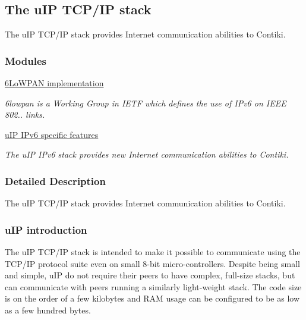 \hypertarget{a00074}{}\subsection{The u\+IP T\+C\+P/\+IP stack}
\label{a00074}


The u\+IP T\+C\+P/\+IP stack provides Internet communication abilities to Contiki.  


\subsubsection*{Modules}
\begin{DoxyCompactItemize}
\item 
\hyperlink{a00070}{6\+Lo\+W\+P\+A\+N implementation}
\begin{DoxyCompactList}\small\item\em 6lowpan is a Working Group in I\+E\+TF which defines the use of I\+Pv6 on I\+E\+EE 802.. links. \end{DoxyCompactList}\item 
\hyperlink{a00075}{u\+I\+P I\+Pv6 specific features}
\begin{DoxyCompactList}\small\item\em The u\+IP I\+Pv6 stack provides new Internet communication abilities to Contiki. \end{DoxyCompactList}\end{DoxyCompactItemize}


\subsubsection{Detailed Description}
The u\+IP T\+C\+P/\+IP stack provides Internet communication abilities to Contiki. 

\hypertarget{a00074_uip-introduction}{}\subsubsection{u\+I\+P introduction}\label{a00074_uip-introduction}
The u\+IP T\+C\+P/\+IP stack is intended to make it possible to communicate using the T\+C\+P/\+IP protocol suite even on small 8-\/bit micro-\/controllers. Despite being small and simple, u\+IP do not require their peers to have complex, full-\/size stacks, but can communicate with peers running a similarly light-\/weight stack. The code size is on the order of a few kilobytes and R\+AM usage can be configured to be as low as a few hundred bytes.

